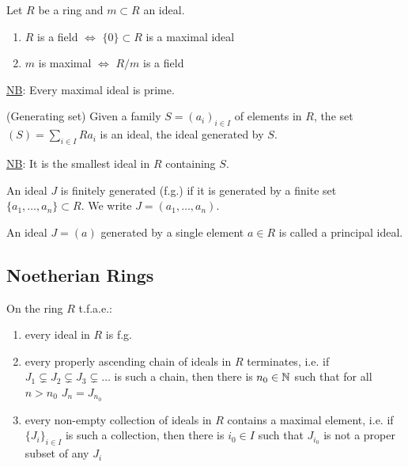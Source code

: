 \documentclass[a4paper,11pt]{article}
\begin{document}
		\begin{prop}
			Let $R$ be a ring and $m\subset R$ an ideal.
			\begin{enumerate}
				\item $R$ is a field $\Longleftrightarrow$ $\{0\}\subset R$ is a maximal ideal
				\item $m$ is maximal $\Longleftrightarrow$ $R/m$ is a field
			\end{enumerate}
		\end{prop}

		\noindent\underline{NB}: Every maximal ideal is prime.

		\begin{defi}(Generating set)
			Given a family $S=(a_i)_{i\in I}$ of elements in $R$, the set $(S)=\sum_{i\in I}Ra_i$ is an ideal, the ideal generated by $S$.
		\end{defi}

		\underline{NB}: It is the smallest ideal in $R$ containing $S$.

		\begin{defi}
			An ideal $J$ is finitely generated (f.g.) if it is generated by a finite set $\{a_1,\dots,a_n\}\subset R$. We write $J=(a_1,\dots,a_n)$.
		\end{defi}

		\begin{defi}
			An ideal $J=(a)$ generated by a single element $a\in R$ is called a principal ideal.
		\end{defi}


		\subsection{Noetherian Rings}

			\begin{prop}
				On the ring $R$ t.f.a.e.:
				\begin{enumerate}
					\item every ideal in $R$ is f.g.
					\item every properly ascending chain of ideals in $R$ terminates, i.e. if $J_1\subsetneq J_2\subsetneq J_3\subsetneq\dots$ is such a chain, then there is $n_0\in \mathbb{N}$ such that for all $n>n_0$ $J_n=J_{n_0}$
					\item every non-empty collection of ideals in $R$ contains a maximal element, i.e. if $\{J_i\}_{i\in I}$ is such a collection, then there is $i_0\in I$ such that $J_{i_0}$ is not a proper subset of any $J_i$
				\end{enumerate}
			\end{prop}
\end{document}
